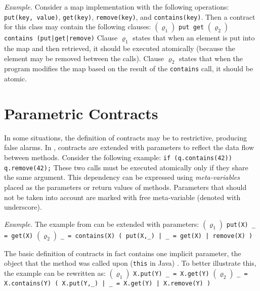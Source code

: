 \emph{Example.} Consider a map implementation with the following operations:
\texttt{put(key, value)}, \texttt{get(key)}, \texttt{remove(key)}, and
\texttt{contains(key)}. Then a contract for this class may contain the following
clauses:  \newline
    $(\varrho_1)$ \texttt{put get} \newline
    $(\varrho_2)$ \texttt{contains (put|get|remove)} \newline
Clause $\varrho_1$ states that when an element is put into the map and then
retrieved, it should be executed atomically (because the element may be removed
between the calls). Clause $\varrho_2$ states that when the program modifies the
map based on the result of the \texttt{contains} call, it should be atomic.


\section{Parametric Contracts}

In some situations, the definition of contracts may be to restrictive, producing
false alarms. In \cite{FITPUB11510}, contracts are extended with parameters to
reflect the data flow between methods. Consider the following example:
\newline
\texttt{if (q.contains(42)) q.remove(42);} \newline
These two calls must be executed atomically only if they share the same
argument. This dependency can be expressed using \emph{meta-variables} placed as
the parameters or return values of methods. Parameters that should not be taken
into account are marked with free meta-variable (denoted with underscore).

\emph{Example.} The example from  can be extended with parameters:
 \newline
    $(\varrho_1)$ \texttt{put(X) \_ = get(X)} \newline
    $(\varrho_2)$ \texttt{\_ = contains(X) ( put(X,\_) | \_ = get(X) | remove(X) )}
    \newline

The basic definition of contracts in fact contains one implicit parameter, the
object that the method was called upon (\texttt{this} in Java)
\cite{FITPUB10817}. To better illustrate this, the example can be rewritten as:
 \newline
    $(\varrho_1)$ \texttt{X.put(Y) \_ = X.get(Y)} \newline
    $(\varrho_2)$ \texttt{\_ = X.contains(Y) ( X.put(Y,\_) | \_ = X.get(Y) | X.remove(Y) )}

